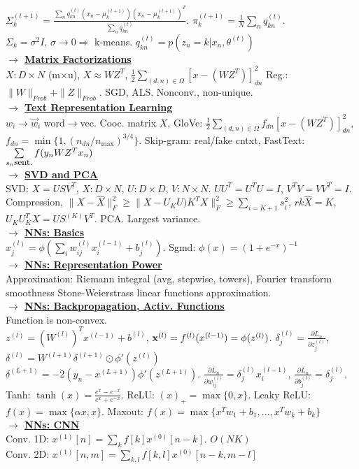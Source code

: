 \documentclass[12pt]{article}
\newcommand{\myvector}[1]{{\bf{#1}}}
\newcommand{\x}{\myvector{x}}
\newcommand{\mytitle}[1]{ {\bf $\rightarrow$ \underline{#1}}\\}
\begin{document}
\begin{multicols*}{2}
$\Sigma_k^{(t+1)}=\frac{\sum_nq_{kn}^{(t)}(x_n-\mu_k^{(t+1)})(x_n-\mu_k^{(t+1)})^T}{\sum_nq_{kn}^{(t)}}$.
$\pi_k^{(t+1)}=\frac{1}{N}\sum_nq_{kn}^{(t)}$.
$\Sigma_k=\sigma^2I,\,\sigma\to0\Rightarrow$ k-means.
$q_{kn}^{(t)}=p(z_n=k|x_n,\theta^{(t)})$\\
\mytitle{Matrix Factorizations}
$X\colon D\times N$ (m$\times$u), $X\approx WZ^T$, $\frac{1}{2}\sum\limits_{(d,n)\in\Omega}\left[x-(WZ^T)\right]_{dn}^2$
Reg.: $\|W\|_{Frob}+\|Z\|_{Frob}$.
SGD, ALS. Nonconv., non-unique.\\
\mytitle{Text Representation Learning}
$w_i\to\vec{w}_i$ word$\rightarrow$vec.
Cooc. matrix $X$, GloVe: $\frac{1}{2}\sum\limits_{(d,n)\in\Omega}f_{dn}\left[x-(WZ^T)\right]_{dn}^2$, $f_{dn}=\min\{1,(n_{dn}/n_{\max})^{3/4}\}$.
Skip-gram: real/fake cntxt, FastText: $\sum\limits_{s_n\mbox{\small sent.}}f(y_nWZ^Tx_n)$\\
\mytitle{SVD and PCA}
SVD: $X=USV^T$, $X\colon D\times N$, $U\colon D\times D$, $V\colon N\times N$.
$UU^T=U^TU=I$, $V^TV=VV^T=I$.
Compression, $\|X-\hat{X}\|^2_F\geqslant \|X-U_KU)K^TX\|^2_F\geqslant\sum\limits_{i=K+1}s_i^2$, $rk\hat{X}=K$, $U_KU_K^TX=US^{(K)}V^T$.
PCA. Largest variance.\\
\mytitle{NNs: Basics}
$x_j^{(l)}=\phi\left(\sum\limits_iw_{ij}^{(l)}x_i^{(l-1)}+b_j^{(l)}\right)$.
Sgmd: $\phi(x)=(1+e^{-x})^{-1}$\\
\mytitle{NNs: Representation Power}
Approximation: Riemann integral (avg, stepwise, towers), Fourier transform smoothness
Stone-Weierstrass linear functions approximation.\\
\mytitle{NNs: Backpropagation, Activ. Functions}
Function is non-convex.\\
$z^{(l)}=(W^{(l)})^Tx^{(l-1)}+b^{(l)}$, $\x^{(l)}=f^{(l)}(x^{(l-1)})=\phi(z^{(l)})$.
$\delta_j^{(l)}=\frac{\partial L_n}{\partial z_j^{(l)}}$, $\delta^{(l)}=W^{(l+1)}\delta^{(l+1)}\odot \phi'(z^{(l)})$\\
$\delta^{(L+1)}=-2(y_n-x^{(L+1)})\phi'(z^{(L+1)})$.
$\frac{\partial L_n}{\partial w_{ij}^{(l)}}=\delta^{(l)}_jx_i^{(l-1)}$,
$\frac{\partial L_n}{\partial b_{j}^{(l)}}=\delta^{(l)}_j$.
Tanh: $\tanh(x)=\frac{e^x-e^{-x}}{e^x+e^{-x}}$.
ReLU: $(x)_+=\max\{0, x\}$.
Leaky ReLU: $f(x)=\max\{\alpha x, x\}$.
Maxout: $f(x)=\max\{x^Tw_1+b_1,...,x^Tw_k+b_k\}$\\
\mytitle{NNs: CNN}
Conv. 1D: $x^{(1)}[n]=\sum\limits_kf[k]x^{(0)}[n-k]$. $O(NK)$\\
Conv. 2D: $x^{(1)}[n,m]=\sum\limits_{k,l}f[k,l]x^{(0)}[n-k,m-l]$\\

\end{multicols*}
\end{document}
